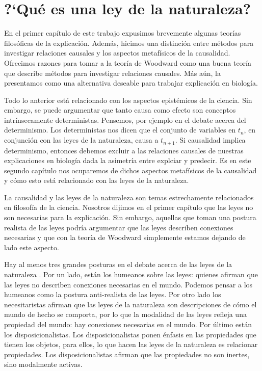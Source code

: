 
\chapter{?`Qué es una ley de la naturaleza?}

\noindent En el primer capítulo de este trabajo expusimos brevemente algunas teorías filosóficas de la explicación. Además, hicimos una distinción entre métodos para investigar relaciones causales y los aspectos metafísicos de la causalidad. Ofrecimos razones para tomar a la teoría de Woodward como una buena teoría que describe métodos para investigar relaciones causales. Más aún, la presentamos como una alternativa deseable para trabajar explicación en biología.

Todo lo anterior está relacionado con los aspectos epistémicos de la ciencia. Sin embargo, se puede argumentar que tanto causa como efecto son conceptos intrínsecamente deterministas. Pensemos, por ejemplo en el debate acerca del determinismo. Los deterministas nos dicen que el conjunto de variables en $t_{n}$, en conjunción con las leyes de la naturaleza, causa a $t_{n+1}$. Si causalidad implica determinismo, entonces debemos excluir a las relaciones causales de nuestras explicaciones en biología dada la asimetría entre explciar y predecir. Es en este segundo capítulo nos ocuparemos de dichos aspectos metafísicos de la causalidad y cómo esto está relacionado con las leyes de la naturaleza.

La causalidad y las leyes de la naturaleza son temas estrechamente relacionados en filosofía de la ciencia. Nosotros dijimos en el primer capítulo que las leyes no son necesarias para la explicación. Sin embargo, aquellas que toman una postura realista de las leyes podría argumentar que las leyes describen conexiones necesarias y que con la teoría de Woodward simplemente estamos dejando de lado este aspecto.

Hay al menos tres grandes posturas en el debate acerca de las leyes de la naturaleza \cite{Borge2019}. Por un lado, están los humeanos sobre las leyes: quienes afirman que las leyes no describen conexiones necesarias en el mundo. Podemos pensar a los humeanos como la postura anti-realista de las leyes. Por otro lado los necesitaristas afirman que las leyes de la naturaleza son descripciones de cómo el mundo de hecho se comporta, por lo que la modalidad de las leyes refleja una propiedad del mundo: hay conexiones necesarias en el mundo. Por último están los disposicionalistas. Los disposicionalistas ponen énfasis en las propiedades que tienen los objetos, para ellos, lo que hacen las leyes de la naturaleza es relacionar propiedades. Los disposicionalistas afirman que las propiedades no son inertes, sino modalmente activas.

